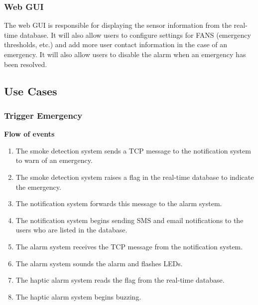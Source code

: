 \subsubsection{Web GUI}

The web GUI is responsible for displaying the sensor information from the real-time database. It will also allow users
to configure settings for FANS (emergency thresholds, etc.) and add more user contact information in the case of an
emergency. It will also allow users to disable the alarm when an emergency has been resolved.

\subsection{Use Cases}

\subsubsection{Trigger Emergency}

\textbf{Flow of events}
\begin{enumerate}
    \item The smoke detection system sends a TCP message to the notification system to warn of an emergency.
    \item The smoke detection system raises a flag in the real-time database to indicate the emergency.
    \item The notification system forwards this message to the alarm system.
    \item The notification system begins sending SMS and email notifications to the users who are listed in the database.
    \item The alarm system receives the TCP message from the notification system.
    \item The alarm system sounds the alarm and flashes LEDs.
    \item The haptic alarm system reads the flag from the real-time database.
    \item The haptic alarm system begins buzzing.
\end{enumerate}
